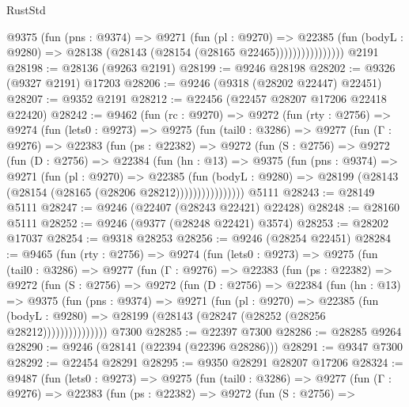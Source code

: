 \begin{lexlean}{RustStd}
\begin{coremodule}
                      @9375
                        (fun (pns : @9374) =>
                        @9271
                          (fun (pl : @9270) =>
                          @22385
                            (fun (bodyL : @9280) =>
                            @28138 (@28143 (@28154 (@28165 @22465))))))))))))))))
    @2191
@28198 := @28136 (@9263 @2191)
@28199 := @9246 @28198
@28202 := @9326 (@9327 @2191) @17203
@28206 := @9246 (@9318 (@28202 @22447) @22451)
@28207 := @9352 @2191
@28212 := @22456 (@22457 @28207 @17206 @22418 @22420)
@28242 := @9462
    (fun (rc : @9270) =>
    @9272
      (fun (rty : @2756) =>
      @9274
        (fun (lets0 : @9273) =>
        @9275
          (fun (tail0 : @3286) =>
          @9277
            (fun (Γ : @9276) =>
            @22383
              (fun (ps : @22382) =>
              @9272
                (fun (S : @2756) =>
                @9272
                  (fun (D : @2756) =>
                  @22384
                    (fun (hn : @13) =>
                    @9375
                      (fun (pns : @9374) =>
                      @9271
                        (fun (pl : @9270) =>
                        @22385
                          (fun (bodyL : @9280) =>
                          @28199 (@28143 (@28154 (@28165 (@28206 @28212))))))))))))))))
    @5111
@28243 := @28149 @5111
@28247 := @9246 (@22407 (@28243 @22421) @22428)
@28248 := @28160 @5111
@28252 := @9246 (@9377 (@28248 @22421) @3574)
@28253 := @28202 @17037
@28254 := @9318 @28253
@28256 := @9246 (@28254 @22451)
@28284 := @9465
    (fun (rty : @2756) =>
    @9274
      (fun (lets0 : @9273) =>
      @9275
        (fun (tail0 : @3286) =>
        @9277
          (fun (Γ : @9276) =>
          @22383
            (fun (ps : @22382) =>
            @9272
              (fun (S : @2756) =>
              @9272
                (fun (D : @2756) =>
                @22384
                  (fun (hn : @13) =>
                  @9375
                    (fun (pns : @9374) =>
                    @9271
                      (fun (pl : @9270) =>
                      @22385
                        (fun (bodyL : @9280) =>
                        @28199 (@28143 (@28247 (@28252 (@28256 @28212)))))))))))))))
    @7300
@28285 := @22397 @7300
@28286 := @28285 @9264
@28290 := @9246 (@28141 (@22394 (@22396 @28286)))
@28291 := @9347 @7300
@28292 := @22454 @28291
@28295 := @9350 @28291 @28207 @17206
@28324 := @9487
    (fun (lets0 : @9273) =>
    @9275
      (fun (tail0 : @3286) =>
      @9277
        (fun (Γ : @9276) =>
        @22383
          (fun (ps : @22382) =>
          @9272
            (fun (S : @2756) =>

\end{coremodule}
\end{lexlean}
